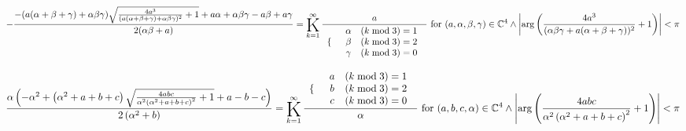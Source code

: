 \documentclass{article}
\newcommand{\bigK}{\mathop{\raisebox{-5pt}{\huge K}}}
\begin{document}
\[-\frac{-(a (\alpha +\beta +\gamma )+\alpha  \beta  \gamma ) \sqrt{\frac{4 a^3}{(a (\alpha +\beta +\gamma )+\alpha  \beta  \gamma )^2}+1}+a \alpha +\alpha  \beta  \gamma -a \beta +a \gamma }{2 (\alpha  \beta +a)}=\bigK_{k=1}^{\infty}\frac{a}{ \begin{array}{cc}  \{ &  \begin{array}{cc}  \alpha  & (k \bmod 3)=1 \\  \beta  & (k \bmod 3)=2 \\  \gamma  & (k \bmod 3)=0 \\ \end{array}  \\ \end{array} }\text{ for }(a,\alpha ,\beta ,\gamma )\in \mathbb{C}^4\land \left| \arg \left(\frac{4 a^3}{(\alpha  \beta  \gamma +a (\alpha +\beta +\gamma ))^2}+1\right)\right| <\pi\] 

\[\frac{\alpha  \left(-\alpha ^2+\left(\alpha ^2+a+b+c\right) \sqrt{\frac{4 a b c}{\alpha ^2 \left(\alpha ^2+a+b+c\right)^2}+1}+a-b-c\right)}{2 \left(\alpha ^2+b\right)}=\bigK_{k=1}^{\infty}\frac{ \begin{array}{cc}  \{ &  \begin{array}{cc}  a & (k \bmod 3)=1 \\  b & (k \bmod 3)=2 \\  c & (k \bmod 3)=0 \\ \end{array}  \\ \end{array} }{\alpha }\text{ for }(a,b,c,\alpha )\in \mathbb{C}^4\land \left| \arg \left(\frac{4 a b c}{\alpha ^2 \left(\alpha ^2+a+b+c\right)^2}+1\right)\right| <\pi\] 
\end{document}
